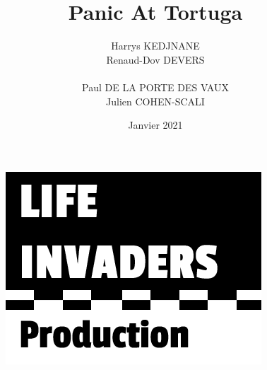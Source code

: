 \documentclass[french, 12pt]{article}
\title{\fontfamily{phv}\selectfont \Huge \textbf{Panic At Tortuga}}
\author{
    \fontfamily{phv}\selectfont
    \vspace{15pt}
    Harrys KEDJNANE\\
    \vspace{15pt}
    \fontfamily{phv}\selectfont
    Renaud-Dov DEVERS\\
    \vspace{15pt}
    \fontfamily{phv}\selectfont
    
    Paul DE LA PORTE DES VAUX\\
    \fontfamily{phv}\selectfont
    Julien COHEN-SCALI\\
    
}
\date{\fontfamily{phv}\selectfont Janvier 2021}
\begin{document}
\begin{titlepage}
    \maketitle
    \thispagestyle{empty}
    \vspace{20pt}
    \begin{figure}[hbt!]
        \centering
        \includegraphics[scale=0.7]{logo_lifeinvaders_copie.png}
    \end{figure}
\end{titlepage}
    
\end{document}
